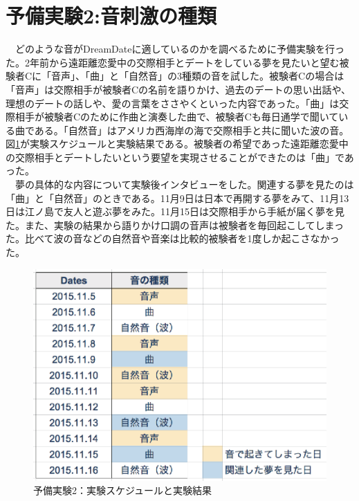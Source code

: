 \section{予備実験2:音刺激の種類}
　どのような音がDreamDateに適しているのかを調べるために予備実験を行った。2年前から遠距離恋愛中の交際相手とデートをしている夢を見たいと望む被験者Cに「音声」、「曲」と「自然音」の3種類の音を試した。被験者Cの場合は「音声」は交際相手が被験者Cの名前を語りかけ、過去のデートの思い出話や、理想のデートの話しや、愛の言葉をささやくといった内容であった。「曲」は交際相手が被験者Cのために作曲と演奏した曲で、被験者Cも毎日通学で聞いている曲である。「自然音」はアメリカ西海岸の海で交際相手と共に聞いた波の音。図\ref{experiment2}が実験スケジュールと実験結果である。被験者の希望であった遠距離恋愛中の交際相手とデートしたいという要望を実現させることができたのは「曲」であった。\\
　夢の具体的な内容について実験後インタビューをした。関連する夢を見たのは「曲」と「自然音」のときである。11月9日は日本で再開する夢をみて、11月13日は江ノ島で友人と遊ぶ夢をみた。11月15日は交際相手から手紙が届く夢を見た。また、実験の結果から語りかけ口調の音声は被験者を毎回起こしてしまった。比べて波の音などの自然音や音楽は比較的被験者を1度しか起こさなかった。

\begin{figure}[htbp]
\begin{center}
\includegraphics[width=13cm]{eps/schedule1.eps}
\caption{予備実験2：実験スケジュールと実験結果}
\label{experiment2}
\end{center}
\end{figure}

